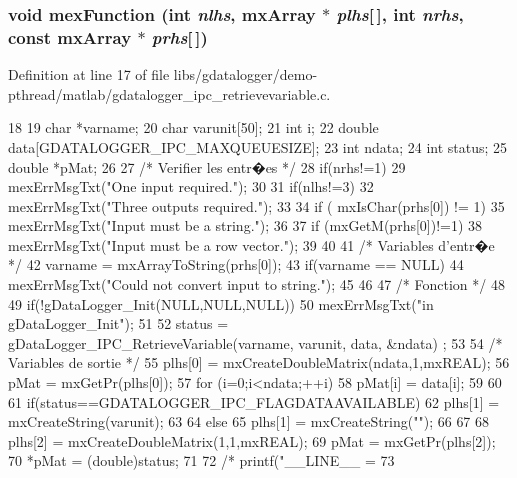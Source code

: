 \subsubsection[{mexFunction}]{\setlength{\rightskip}{0pt plus 5cm}void mexFunction (int {\em nlhs}, \/  mxArray $\ast$ {\em plhs}[$\,$], \/  int {\em nrhs}, \/  const mxArray $\ast$ {\em prhs}[$\,$])}\label{libs_2gdatalogger_2demo-pthread_2matlab_2gdatalogger__ipc__retrievevariable_8c_a6a215cbfde54f82a3ce599228fc3fce5}


Definition at line 17 of file libs/gdatalogger/demo-\/pthread/matlab/gdatalogger\_\-ipc\_\-retrievevariable.c.


\begin{DoxyCode}
18 {
19         char  *varname;
20         char  varunit[50];
21         int       i;
22         double data[GDATALOGGER_IPC_MAXQUEUESIZE];
23         int ndata;
24     int status;
25         double *pMat;
26 
27         /* Verifier les entr�es */
28         if(nrhs!=1){
29                 mexErrMsgTxt("One input required.");
30                 }
31         if(nlhs!=3){
32                 mexErrMsgTxt("Three outputs required.");
33                 }
34     if ( mxIsChar(prhs[0]) != 1){
35       mexErrMsgTxt("Input must be a string.");
36         }
37     if (mxGetM(prhs[0])!=1){
38       mexErrMsgTxt("Input must be a row vector.");
39         }
40                 
41         /* Variables d'entr�e */
42     varname = mxArrayToString(prhs[0]);
43     if(varname == NULL) {
44       mexErrMsgTxt("Could not convert input to string.");
45         }
46 
47         /* Fonction */
48 
49         if(!gDataLogger_Init(NULL,NULL,NULL)){
50                 mexErrMsgTxt("\nError in gDataLogger_Init\n\n");
51         }
52         status = gDataLogger_IPC_RetrieveVariable(varname, varunit, data, &ndata)
      ;
53 
54         /* Variables de sortie */
55         plhs[0] = mxCreateDoubleMatrix(ndata,1,mxREAL);
56         pMat = mxGetPr(plhs[0]);
57         for (i=0;i<ndata;++i){
58                 pMat[i] = data[i];
59         }
60     
61     if(status==GDATALOGGER_IPC_FLAGDATAAVAILABLE){
62         plhs[1] = mxCreateString(varunit);
63     }
64     else{
65         plhs[1] = mxCreateString("");
66     }
67     
68     plhs[2] = mxCreateDoubleMatrix(1,1,mxREAL);
69         pMat = mxGetPr(plhs[2]);
70     *pMat = (double)status;
71     
72 /*    printf("__LINE__ = %
73 }
\end{DoxyCode}
